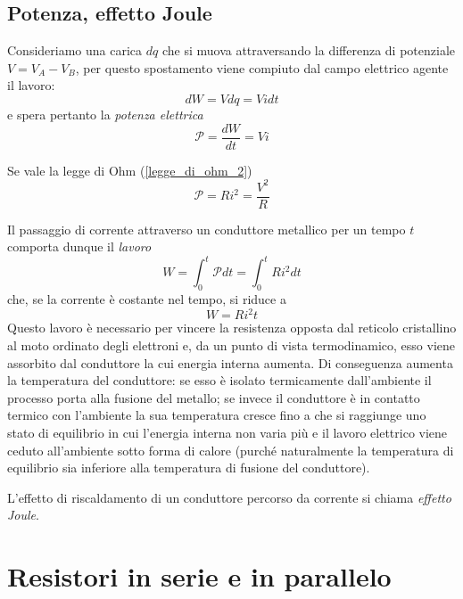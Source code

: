 \documentclass[class=book, crop=false, oneside, 12pt]{standalone}
\begin{document}
\subsection{Potenza, effetto Joule}

Consideriamo una carica \(dq\) che si muova attraversando la differenza di potenziale \(V= V_A -V_B\), per questo spostamento viene compiuto dal campo elettrico agente il lavoro:
\begin{equation*}
    d W = V dq = V i dt
\end{equation*}
e spera pertanto la \emph{potenza elettrica}
\begin{equation}
    \mathcal{P} = \frac{dW}{dt} = V i
\end{equation}

Se vale la legge di Ohm (\ref{legge_di_ohm_2})
\begin{equation}
    \mathcal{P} = R i^2 = \frac{V^2}{R}
\end{equation}

Il passaggio di corrente attraverso un conduttore metallico per un tempo \(t\) comporta dunque il \emph{lavoro} 
\begin{equation}
    W = \int_0^t \mathcal{P} dt = \int_0^t R i^2 dt
\end{equation}
che, se la corrente è costante nel tempo, si riduce a
\begin{equation}
    W = R i^2 t
\end{equation}
Questo lavoro è necessario per vincere la resistenza opposta dal reticolo cristallino al moto ordinato degli elettroni e, da un punto di vista termodinamico, esso viene assorbito dal conduttore la cui energia interna aumenta. 
Di conseguenza aumenta la temperatura del conduttore: se esso è isolato termicamente dall'ambiente il processo porta alla fusione del metallo; se invece il conduttore è in contatto termico con l'ambiente la sua temperatura cresce fino a che si raggiunge uno stato di equilibrio in cui l'energia interna non varia più e il lavoro elettrico viene ceduto all'ambiente sotto forma di calore (purché naturalmente la temperatura di equilibrio sia inferiore alla temperatura di fusione del conduttore). 

L'effetto di riscaldamento di un conduttore percorso da corrente si chiama \emph{effetto Joule}. 

\section{Resistori in serie e in parallelo}
\end{document}
